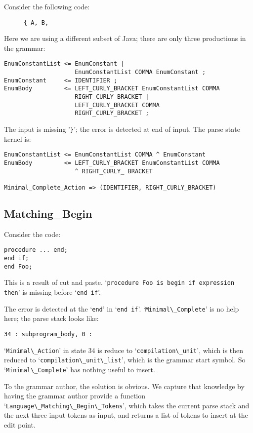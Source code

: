 \documentclass{article}
\newcommand{\code}[1]{`\lstinline|#1|'}
\begin{document}
Consider the following code:
\begin{figure}[H]
\begin{lstlisting}
{ A, B,
\end{lstlisting}
\caption{}
\label{ex:minimal_complete_cycle_check}
\end{figure}
Here we are using a different subset of Java; there are only three
productions in the grammar:
\begin{verbatim}
EnumConstantList <= EnumConstant |
                    EnumConstantList COMMA EnumConstant ;
EnumConstant     <= IDENTIFIER ;
EnumBody         <= LEFT_CURLY_BRACKET EnumConstantList COMMA
                    RIGHT_CURLY_BRACKET |
                    LEFT_CURLY_BRACKET COMMA
                    RIGHT_CURLY_BRACKET ;
\end{verbatim}
The input is missing '\lstinline|}|'; the error is detected at end of
input. The parse state kernel is:
\begin{verbatim}
EnumConstantList <= EnumConstantList COMMA ^ EnumConstant
EnumBody         <= LEFT_CURLY_BRACKET EnumConstantList COMMA
                    ^ RIGHT_CURLY_ BRACKET

Minimal_Complete_Action => (IDENTIFIER, RIGHT_CURLY_BRACKET)
\end{verbatim}

\subsection{Matching\_Begin}
Consider the code:
\begin{lstlisting}
procedure ... end;
end if;
end Foo;
\end{lstlisting}
This is a result of cut and paste.
\code{procedure Foo is begin if expression then} is missing before
\code{end if}.

The error is detected at the \code{end} in \code{end if}.
\code{Minimal\_Complete} is no help here; the parse stack looks like:
\begin{verbatim}
34 : subprogram_body, 0 :
\end{verbatim}
\code{Minimal\_Action} in state 34 is reduce to
\code{compilation\_unit}, which is then reduced to
\code{compilation\_unit\_list}, which is the grammar start symbol. So
\code{Minimal\_Complete} has nothing useful to insert.

To the grammar author, the solution is obvious. We capture that
knowledge by having the grammar author provide a function\\
\code{Language\_Matching\_Begin\_Tokens}, which takes the current parse
stack and the next three input tokens as input, and returns a list of
tokens to insert at the edit point.
\end{document}
